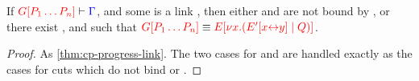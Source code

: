 \begin{lemmaB}\label{thm:nc-progress-link}
  If $\seq[{ \cpPlug{G}{P_1 \dots P_n} }]{ \Gamma }$, and some  is a
  link , then either  and  are not bound by
  , or there exist ,  and  such that
  $\tm{\cpPlug{G}{P_1 \dots P_n}} \equiv \tm{\cpPlug{E}{\cpCut{x}{\cpPlug{E'}{\cpLink{x}{y}}}{Q}}}$.
\end{lemmaB}
\begin{proof}
  As \cref{thm:cp-progress-link}. The two cases for
  and
  are handled exactly as the cases for cuts which do not bind  or .
\end{proof}
